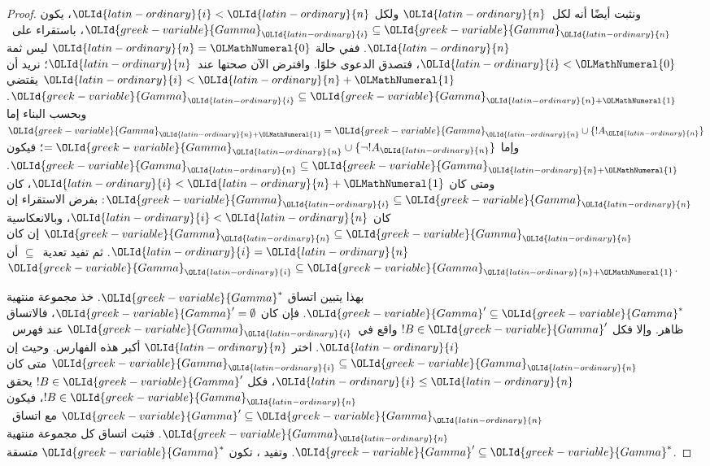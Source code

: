 \documentclass[../../../include/open-logic-section]{subfiles}
\begin{document}
\begin{proof}
ونثبت أيضًا أنه لكل~$\OLId{latin-ordinary}{n}$ ولكل $\OLId{latin-ordinary}{i} < \OLId{latin-ordinary}{n}$، يكون $\OLId{greek-variable}{Gamma}_\OLId{latin-ordinary}{i} \subseteq \OLId{greek-variable}{Gamma}_\OLId{latin-ordinary}{n}$،
باستقراء على~$\OLId{latin-ordinary}{n}$. ففي حالة $\OLId{latin-ordinary}{n}=\OLMathNumeral{0}$ ليس ثمة $\OLId{latin-ordinary}{i} < \OLMathNumeral{0}$، فتصدق الدعوى
خلوًا. وافترض الآن صحتها عند~$\OLId{latin-ordinary}{n}$؛ نريد أن $\OLId{latin-ordinary}{i} < \OLId{latin-ordinary}{n}+\OLMathNumeral{1}$ يقتضي
$\OLId{greek-variable}{Gamma}_\OLId{latin-ordinary}{i} \subseteq \OLId{greek-variable}{Gamma}_{\OLId{latin-ordinary}{n}+\OLMathNumeral{1}}$. وبحسب البناء إما
$\OLId{greek-variable}{Gamma}_{\OLId{latin-ordinary}{n}+\OLMathNumeral{1}} = \OLId{greek-variable}{Gamma}_\OLId{latin-ordinary}{n} \cup \{!A_\OLId{latin-ordinary}{n}\}$ وإما $= \OLId{greek-variable}{Gamma}_\OLId{latin-ordinary}{n} \cup \{\lnot
!A_\OLId{latin-ordinary}{n}\}$؛ فيكون $\OLId{greek-variable}{Gamma}_\OLId{latin-ordinary}{n} \subseteq \OLId{greek-variable}{Gamma}_{\OLId{latin-ordinary}{n}+\OLMathNumeral{1}}$. ومتى كان $\OLId{latin-ordinary}{i} < \OLId{latin-ordinary}{n}+\OLMathNumeral{1}$،
كان $\OLId{greek-variable}{Gamma}_\OLId{latin-ordinary}{i} \subseteq \OLId{greek-variable}{Gamma}_\OLId{latin-ordinary}{n}$: بفرض الاستقراء إن كان $\OLId{latin-ordinary}{i} < \OLId{latin-ordinary}{n}$،
وبالانعكاسية $\OLId{greek-variable}{Gamma}_\OLId{latin-ordinary}{n} \subseteq \OLId{greek-variable}{Gamma}_\OLId{latin-ordinary}{n}$ إن كان $\OLId{latin-ordinary}{i} = \OLId{latin-ordinary}{n}$. ثم تفيد
تعدية~$\subseteq$ أن $\OLId{greek-variable}{Gamma}_\OLId{latin-ordinary}{i} \subseteq \OLId{greek-variable}{Gamma}_{\OLId{latin-ordinary}{n}+\OLMathNumeral{1}}$.

بهذا يتبين اتساق $\OLId{greek-variable}{Gamma}^*$. خذ مجموعة منتهية
$\OLId{greek-variable}{Gamma}' \subseteq \OLId{greek-variable}{Gamma}^*$. فإن كان $\OLId{greek-variable}{Gamma}'=\emptyset$، فالاتساق
ظاهر. وإلا فكل $!B \in \OLId{greek-variable}{Gamma}'$ واقع في~$\OLId{greek-variable}{Gamma}_\OLId{latin-ordinary}{i}$ عند فهرس~$\OLId{latin-ordinary}{i}$.
اختر $\OLId{latin-ordinary}{n}$ أكبر هذه الفهارس. وحيث إن
$\OLId{greek-variable}{Gamma}_\OLId{latin-ordinary}{i} \subseteq \OLId{greek-variable}{Gamma}_\OLId{latin-ordinary}{n}$ متى كان $\OLId{latin-ordinary}{i} \le \OLId{latin-ordinary}{n}$، فكل
$!B \in \OLId{greek-variable}{Gamma}'$ يحقق $!B \in \OLId{greek-variable}{Gamma}_\OLId{latin-ordinary}{n}$، فيكون
$\OLId{greek-variable}{Gamma}' \subseteq \OLId{greek-variable}{Gamma}_\OLId{latin-ordinary}{n}$ مع اتساق~$\OLId{greek-variable}{Gamma}_\OLId{latin-ordinary}{n}$. فثبت اتساق كل
مجموعة منتهية $\OLId{greek-variable}{Gamma}' \subseteq \OLId{greek-variable}{Gamma}^*$. وتفيد ، تكون $\OLId{greek-variable}{Gamma}^*$ متسقة.


\end{proof}
\end{document}
